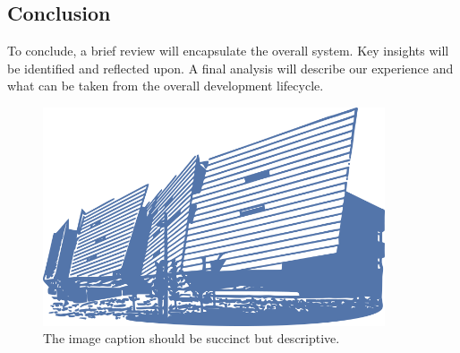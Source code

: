 \subsection{Conclusion}
To conclude, a brief review will encapsulate the overall system. Key insights will be identified and reflected upon. A final analysis will describe our experience and what can be taken from the overall development lifecycle.

\begin{figure}[h!]
	\caption{The image caption should be succinct but descriptive.}
	\label{image:myImageName}
	\centering
	\includegraphics[width=0.9\textwidth]{images/gmit-building.png}
\end{figure}	